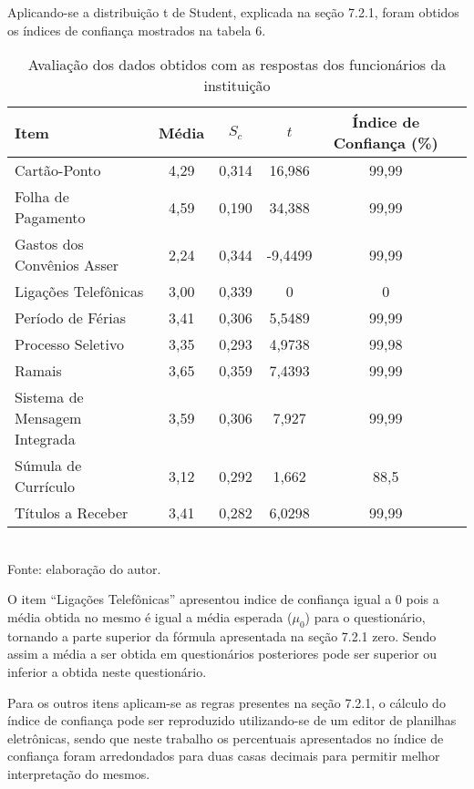 Aplicando-se a distribuição t de Student, explicada na seção 7.2.1, foram obtidos os índices de confiança mostrados na tabela 6.

\begin{table}[!hbt]
\centering
\caption[Avaliação dos dados obtidos - Funcionário]{Avaliação dos dados obtidos com as respostas dos funcionários da instituição}
\vspace{3mm}
\begin{tabular}{|p{5cm}|c|c|c|c|c|}\hline
\textbf{Item} & \textbf{Média} & \textbf{$S_c$} & \textbf{$t$} & \textbf{Índice de Confiança (\%)} \\ \hline
Cartão-Ponto & 4,29 & 0,314 & 16,986 & 99,99 \\ \hline
Folha de Pagamento & 4,59 & 0,190 & 34,388 & 99,99 \\ \hline
Gastos dos Convênios Asser & 2,24 & 0,344 & -9,4499 & 99,99 \\ \hline
Ligações Telefônicas & 3,00 & 0,339 & 0 & 0 \\ \hline
Período de Férias & 3,41 & 0,306 & 5,5489 & 99,99 \\ \hline
Processo Seletivo & 3,35 & 0,293 & 4,9738 & 99,98 \\ \hline
Ramais & 3,65 & 0,359 & 7,4393 & 99,99 \\ \hline
Sistema de Mensagem Integrada & 3,59 & 0,306 & 7,927 & 99,99\\ \hline
Súmula de Currículo & 3,12 & 0,292 & 1,662 & 88,5 \\ \hline
Títulos a Receber & 3,41 & 0,282 & 6,0298 & 99,99 \\ \hline
\end{tabular}
\\ Fonte: elaboração do autor.
\end{table}

O item “Ligações Telefônicas'' apresentou indice de confiança igual a 0 pois a média obtida no mesmo é igual a média esperada ($\mu_0$) para o questionário, tornando a parte superior da fórmula apresentada na seção 7.2.1 zero. Sendo assim a média a ser obtida em questionários posteriores pode ser superior ou inferior a obtida neste questionário.

Para os outros itens aplicam-se as regras presentes na seção 7.2.1, o cálculo do índice de confiança pode ser reproduzido utilizando-se de um editor de planilhas eletrônicas, sendo que neste trabalho os percentuais apresentados no índice de confiança foram arredondados para duas casas decimais para permitir melhor interpretação do mesmos. 

